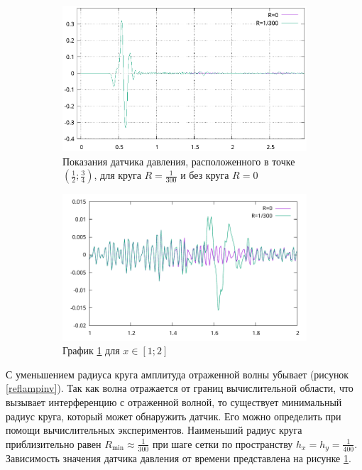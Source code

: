 \documentclass[a4paper, fontsize=14pt]{article}
\begin{document}
\begin{figure}
    \centering
	\begin{subfigure}{1\textwidth}
	\centering
	\includegraphics[width=1\textwidth]{sensor.eps}
	\caption{Показания датчика давления, расположенного в точке
	$\left(\frac{1}{2};\frac{3}{4}\right)$, для круга $R = \frac{1}{300}$ и без круга $R=0$}
	\label{sensor}
	\end{subfigure}
	\begin{subfigure}{1\textwidth}
	\centering
	\includegraphics[width=1\textwidth]{sensordiff.pdf}
	\caption{График \ref{sensor} для $x\in[1;2]$}
	\label{sensordiff}
	\end{subfigure}
    \caption{}
\end{figure}

С уменьшением радиуса круга амплитуда отраженной волны убывает (рисунок \ref{reflampinv}). Так как
волна отражается от границ вычислительной области, что вызывает интерференцию с отраженной волной, 
то существует минимальный радиус круга, который может обнаружить датчик.
Его можно определить при помощи вычислительных экспериментов. Наименьший радиус круга
приблизительно равен $R_\text{min} \approx \frac{1}{300}$ при шаге сетки по пространству $h_x = h_y
= \frac{1}{400}$. Зависимость значения датчика давления от времени представлена на рисунке
\ref{sensor}.
\end{document}
